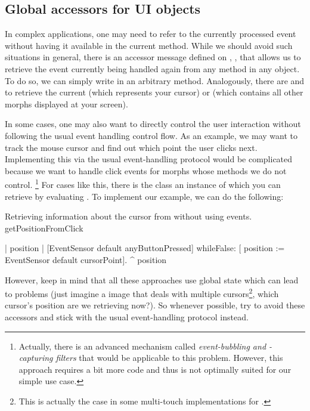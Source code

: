 \documentclass[a4paper,10pt,twoside]{book}
\begin{document}
\subsection{Global accessors for UI objects}

In complex applications, one may need to refer to the currently processed event without having it available in the current method.
While we should avoid such situations in general, there is an accessor message defined on , , that allows us to retrieve the event currently being handled again from any method in any object.
To do so, we can simply write  in an arbitrary method.
Analogously, there are  and  to retrieve the current  (which represents your cursor) or  (which contains all other morphs displayed at your screen).

In some cases, one may also want to directly control the user interaction without following the usual event handling control flow.
As an example, we may want to track the mouse cursor and find out which point the user clicks next.
Implementing this via the usual event-handling protocol would be complicated because we want to handle click events for morphs whose methods we do not control.%
\footnote{Actually, there is an advanced mechanism called \emph{event-bubbling and -capturing filters} that would be applicable to this problem.
	However, this approach requires a bit more code and thus is not optimally suited for our simple use case.}
For cases like this, there is the class  an instance of which you can retrieve by evaluating .
To implement our example, we can do the following:
\begin{method}{Retrieving information about the cursor from  without using events.}
getPositionFromClick

	| position |
	[EventSensor default anyButtonPressed] whileFalse: [
		position := EventSensor default cursorPoint].
	^ position
\end{method}

However, keep in mind that all these approaches use global state which can lead to problems (just imagine a \sq image that deals with multiple cursors\footnote{This is actually the case in some multi-touch implementations for \sq{}.}, which cursor's position are we retrieving now?).
So whenever possible, try to avoid these accessors and stick with the usual event-handling protocol instead.
\end{document}
